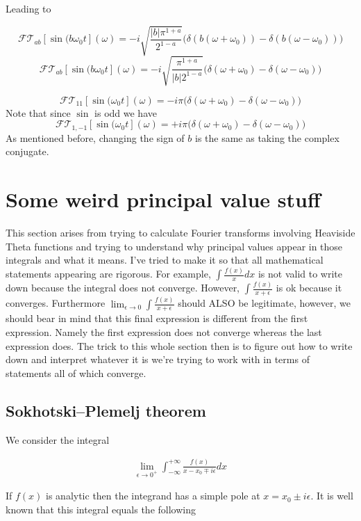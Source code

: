 \documentclass[12pt]{article}
\begin{document}
Leading to

\[
\mathcal{FT}_{ab}[\sin(b\omega_0 t](\omega) = -i \sqrt{\frac{|b| \pi^{1+a}}{2^{1-a}}}\big(\delta(b(\omega+\omega_0))-\delta(b(\omega-\omega_0))\big)\]
\[
\mathcal{FT}_{ab}[\sin(b\omega_0 t](\omega) = -i \sqrt{\frac{\pi^{1+a}}{|b|2^{1-a}}}\big(\delta(\omega+\omega_0)-\delta(\omega-\omega_0)\big)\]


\[\mathcal{FT}_{11}[\sin(\omega_0 t](\omega) = -i \pi\big(\delta(\omega+\omega_0)-\delta(\omega-\omega_0)\big)\]
Note that since $\sin$ is odd we have
\[\mathcal{FT}_{1,-1}[\sin(\omega_0 t](\omega) = +i \pi\big(\delta(\omega+\omega_0)-\delta(\omega-\omega_0)\big)\]
As mentioned before, changing the sign of $b$ is the same as taking the complex conjugate.

\section{Some weird principal value stuff}

This section arises from trying to calculate Fourier transforms involving Heaviside Theta functions and trying to understand why principal values appear in those integrals and what it means. I've tried to make it so that all mathematical statements appearing are rigorous. For example, $\int \frac{f(x)}{x} dx$ is not valid to write down because the integral does not converge. However, $\int \frac{f(x)}{x+\epsilon}$ is ok because it converges. Furthermore $\lim_{\epsilon \to 0} \int \frac{f(x)}{x+\epsilon}$ should ALSO be legitimate, however, we should bear in mind that this final expression is different from the first expression. Namely the first expression does not converge whereas the last expression does. The trick to this whole section then is to figure out how to write down and interpret whatever it is we're trying to work with in terms of statements all of which converge.

\subsection{Sokhotski–Plemelj theorem}

We consider the integral

\begin{align}
\lim_{\epsilon \rightarrow 0^+} \int_{-\infty}^{+\infty} \frac{f(x)}{x - x_0 \mp i \epsilon} dx
\end{align}

If $f(x)$ is analytic then the integrand has a simple pole at $x = x_0 \pm i \epsilon$. It is well known that this integral equals the following
\end{document}
